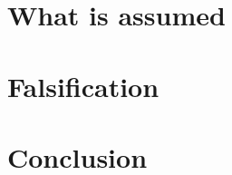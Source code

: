 \documentclass[aps,prd,twocolumn,superscriptaddress,nofootinbib,showpacs]{revtex4-2}
\begin{document}
\section{What is assumed}

\section{Falsification}

\section{Conclusion}

\begin{acknowledgments}
\end{acknowledgments}



\end{document}
